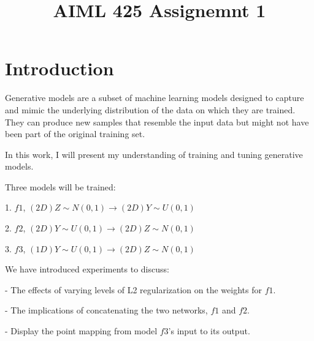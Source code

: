 \documentclass{article}
\title{AIML 425 Assignemnt 1}
\begin{document}
%
\maketitle
%
\section{Introduction}
\label{sec:intro}

Generative models are a subset of machine learning models designed to capture and mimic the underlying distribution of the data on which they are trained. They can produce new samples that resemble the input data but might not have been part of the original training set.

In this work, I will present my understanding of training and tuning generative models.

Three models will be trained:

1. $f1$, $(2D)Z\sim N(0,1) \rightarrow (2D)Y\sim U(0,1)$

2. $f2$, $(2D)Y\sim U(0,1) \rightarrow (2D)Z\sim N(0,1)$

3. $f3$, $(1D) Y\sim U(0,1) \rightarrow (2D) Z\sim N(0,1)$

We have introduced experiments to discuss:

  - The effects of varying levels of L2 regularization on the weights for $f1$.
  
  - The implications of concatenating the two networks, $f1$ and $f2$.

  - Display the point mapping from model $f3$'s input to its output.

  
\end{document}
